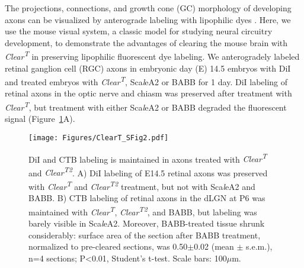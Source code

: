 The projections, connections, and growth cone (GC) morphology of developing axons can be visualized by anterograde labeling with lipophilic dyes \cite{little2009specificity,bielle2011emergent}.
Here, we use the mouse visual system, a classic model for studying neural circuitry development, to demonstrate the advantages of clearing the mouse brain with \emph{Clear\textsuperscript{T}} in preserving lipophilic fluorescent dye labeling.
We anterogradely labeled retinal ganglion cell (RGC) axons in embryonic day (E) 14.5 embryos with DiI and treated embryos with \emph{Clear\textsuperscript{T}}, Sca\emph{l}eA2 or BABB for 1 day.
DiI labeling of retinal axons in the optic nerve and chiasm was preserved after treatment with \emph{Clear\textsuperscript{T}}, but treatment with either Sca\emph{l}eA2 or BABB degraded the fluorescent signal (Figure~\ref{ClearTSFig2}A).
\begin{figure}[hbtp]
    \begin{center}
        \texttt{[image: Figures/ClearT\_SFig2.pdf]}
        \caption[DiI and CTB labeling is maintained in axons treated with \emph{Clear\textsuperscript{T}} and \emph{Clear\textsuperscript{T2}}.]
        {DiI and CTB labeling is maintained in axons treated with \emph{Clear\textsuperscript{T}} and \emph{Clear\textsuperscript{T2}}.
        A) DiI labeling of E14.5 retinal axons was preserved with \emph{Clear\textsuperscript{T}} and \emph{Clear\textsuperscript{T2}} treatment, but not with Sca\emph{l}eA2 and BABB.
        B) CTB labeling of retinal axons in the dLGN at P6 was maintained with \emph{Clear\textsuperscript{T}}, \emph{Clear\textsuperscript{T2}}, and BABB, but labeling was barely visible in Sca\emph{l}eA2.
        Moreover, BABB-treated tissue shrunk considerably: surface area of the section after BABB treatment, normalized to pre-cleared sections, was 0.50$\pm$0.02 (mean $\pm$ s.e.m.), n=4 sections; P<0.01, Student's t-test.
        Scale bars: 100$\mu$m.
        }
        \label{ClearTSFig2}
    \end{center}
\end{figure}

